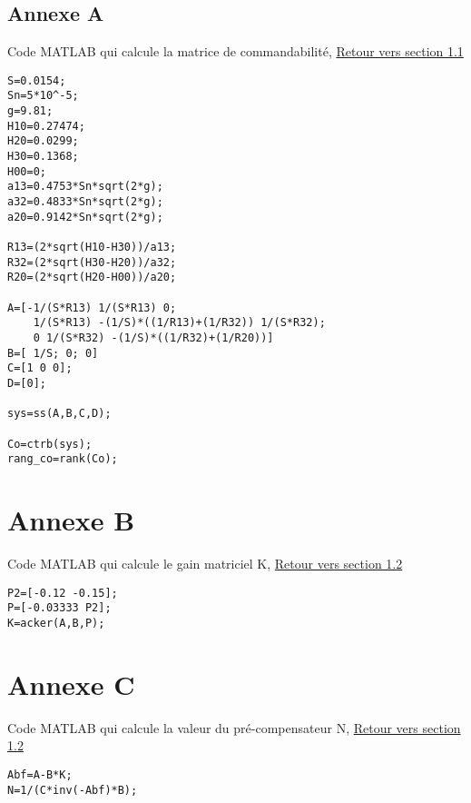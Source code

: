 \begin{appendices}

\chapter*{Annexe A}
	
	Code MATLAB qui calcule la matrice de commandabilité,\label{Annexe A} \hyperref[Co]{Retour vers section 1.1}
	
	\begin{lstlisting}	
S=0.0154;
Sn=5*10^-5;
g=9.81;
H10=0.27474;
H20=0.0299;
H30=0.1368;
H00=0;
a13=0.4753*Sn*sqrt(2*g);
a32=0.4833*Sn*sqrt(2*g);
a20=0.9142*Sn*sqrt(2*g);

R13=(2*sqrt(H10-H30))/a13;
R32=(2*sqrt(H30-H20))/a32;
R20=(2*sqrt(H20-H00))/a20;

A=[-1/(S*R13) 1/(S*R13) 0;
    1/(S*R13) -(1/S)*((1/R13)+(1/R32)) 1/(S*R32);
    0 1/(S*R32) -(1/S)*((1/R32)+(1/R20))]
B=[ 1/S; 0; 0]
C=[1 0 0];
D=[0];

sys=ss(A,B,C,D);

Co=ctrb(sys);
rang_co=rank(Co);
	\end{lstlisting}

\end{appendices}


\chapter*{Annexe B}
	
	Code MATLAB qui calcule le gain matriciel K,\label{Annexe B} \hyperref[K]{Retour vers section 1.2}
	
	\begin{lstlisting}	
P2=[-0.12 -0.15];
P=[-0.03333 P2];
K=acker(A,B,P); 
	\end{lstlisting}	
	
\chapter*{Annexe C}
	
	Code MATLAB qui calcule la valeur du pré-compensateur N,\label{Annexe C} \hyperref[N]{Retour vers section 1.2}
	
	\begin{lstlisting}	
Abf=A-B*K;
N=1/(C*inv(-Abf)*B);
	\end{lstlisting}		
	
